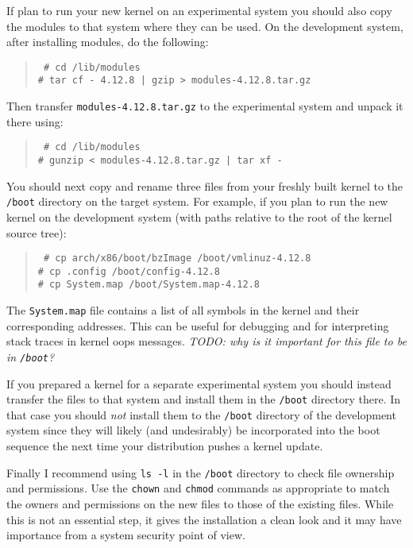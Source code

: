 \documentclass{article}
\newcommand{\command}[1]{\texttt{#1}}
\newcommand{\filename}[1]{\texttt{#1}}
\newcommand{\todo}[1]{\textit{TODO: #1}}
\newenvironment{commands}
  {\begin{quote} \tt}
  {\end{quote}}
\begin{document}
If plan to run your new kernel on an experimental system you should also copy the modules to
that system where they can be used. On the development system, after installing modules, do the
following:
\begin{commands}
\# cd /lib/modules \\
\# tar cf - 4.12.8 | gzip > modules-4.12.8.tar.gz
\end{commands}

Then transfer \filename{modules-4.12.8.tar.gz} to the experimental system and unpack it there
using:
\begin{commands}
\# cd /lib/modules \\
\# gunzip < modules-4.12.8.tar.gz | tar xf -
\end{commands}

You should next copy and rename three files from your freshly built kernel to the
\filename{/boot} directory on the target system. For example, if you plan to run the new kernel
on the development system (with paths relative to the root of the kernel source tree):
\begin{commands}
\# cp arch/x86/boot/bzImage /boot/vmlinuz-4.12.8 \\
\# cp .config /boot/config-4.12.8 \\
\# cp System.map /boot/System.map-4.12.8
\end{commands}

The \filename{System.map} file contains a list of all symbols in the kernel and their
corresponding addresses. This can be useful for debugging and for interpreting stack traces in
kernel oops messages. \todo{why is it important for this file to be in \filename{/boot}?}

If you prepared a kernel for a separate experimental system you should instead transfer the
files to that system and install them in the \filename{/boot} directory there. In that case you
should \emph{not} install them to the \filename{/boot} directory of the development system since
they will likely (and undesirably) be incorporated into the boot sequence the next time your
distribution pushes a kernel update.

Finally I recommend using \command{ls -l} in the \filename{/boot} directory to check file
ownership and permissions. Use the \command{chown} and \command{chmod} commands as appropriate
to match the owners and permissions on the new files to those of the existing files. While this
is not an essential step, it gives the installation a clean look and it may have importance from
a system security point of view.
\end{document}
